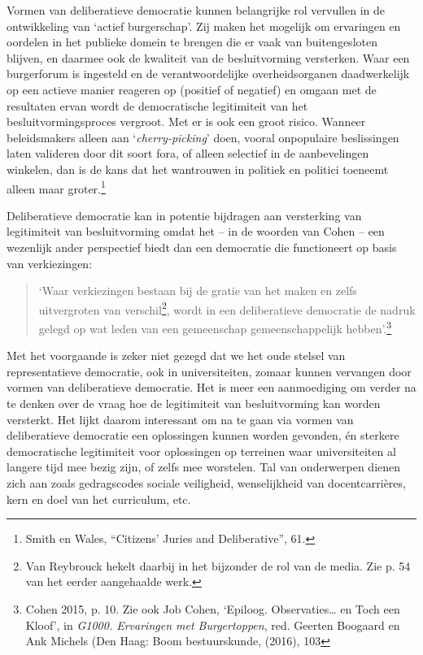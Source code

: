 \documentclass[smallauthor, chapterhaspagenum, nochapterinheader, pagenuminheader,  bigchapnum,medium2, tocpages,  garamond, titleinheader]{jote-book}
\begin{document}
	Vormen van deliberatieve democratie kunnen belangrijke rol vervullen in de ontwikkeling van ‘actief burgerschap'. Zij maken het mogelijk om ervaringen en oordelen in het publieke domein te brengen die er vaak van buitengesloten blijven, en daarmee ook de kwaliteit van de besluitvorming versterken. Waar een burgerforum is ingesteld en de verantwoordelijke overheidsorganen daadwerkelijk op een actieve manier reageren op (positief of negatief) en omgaan met de resultaten ervan wordt de democratische legitimiteit van het besluitvormingsproces vergroot. Met er is ook een groot risico. Wanneer beleidsmakers alleen aan ‘\emph{cherry-picking}' doen, vooral onpopulaire beslissingen laten valideren door dit soort fora, of alleen selectief in de aanbevelingen winkelen, dan is de kans dat het wantrouwen in politiek en politici toeneemt alleen maar groter.\footnote{Smith en Wales, “Citizens' Juries and Deliberative”, 61.}



	Deliberatieve democratie kan in potentie bijdragen aan versterking van legitimiteit van besluitvorming omdat het -- in de woorden van Cohen -- een wezenlijk ander perspectief biedt dan een democratie die functioneert op basis van verkiezingen:

	\begin{quote}
		\itshape

		‘Waar verkiezingen bestaan bij de gratie van het maken en zelfs uitvergroten van verschil\footnote{Van Reybrouck hekelt daarbij in het bijzonder de rol van de media. Zie p. 54 van het eerder aangehaalde werk.}, wordt in een deliberatieve democratie de nadruk gelegd op wat leden van een gemeenschap gemeenschappelijk hebben'.\footnote{Cohen 2015, p. 10. Zie ook Job Cohen, ‘Epiloog. Observaties… en Toch een Kloof', in \emph{G1000. Ervaringen met Burgertoppen}, red. Geerten Boogaard en Ank Michels (Den Haag: Boom bestuurskunde, (2016), 103}
	\end{quote}

	Met het voorgaande is zeker niet gezegd dat we het oude stelsel van representatieve democratie, ook in universiteiten, zomaar kunnen vervangen door vormen van deliberatieve democratie. Het is meer een aanmoediging om verder na te denken over de vraag hoe de legitimiteit van besluitvorming kan worden versterkt. Het lijkt daarom interessant om na te gaan via vormen van deliberatieve democratie een oplossingen kunnen worden gevonden, én sterkere democratische legitimiteit voor oplossingen op terreinen waar universiteiten al langere tijd mee bezig zijn, of zelfs mee worstelen. Tal van onderwerpen dienen zich aan zoals gedragscodes sociale veiligheid, wenselijkheid van docentcarrières, kern en doel van het curriculum, etc.
\end{document}
